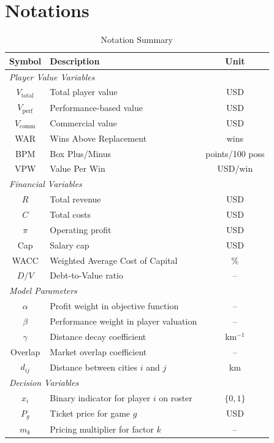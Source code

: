 \documentclass{mcmthesis}
\begin{document}
\section{Notations}    %

\begin{table}[H]
\centering
\caption{Notation Summary}
\begin{tabular}{clc}
\toprule
\textbf{Symbol} & \textbf{Description} & \textbf{Unit} \\
\midrule
\multicolumn{3}{l}{\textit{Player Value Variables}} \\
$V_{\text{total}}$ & Total player value & USD \\
$V_{\text{perf}}$ & Performance-based value & USD \\
$V_{\text{comm}}$ & Commercial value & USD \\
WAR & Wins Above Replacement & wins \\
BPM & Box Plus/Minus & points/100 poss \\
VPW & Value Per Win & USD/win \\
\midrule
\multicolumn{3}{l}{\textit{Financial Variables}} \\
$R$ & Total revenue & USD \\
$C$ & Total costs & USD \\
$\pi$ & Operating profit & USD \\
Cap & Salary cap & USD \\
WACC & Weighted Average Cost of Capital & \% \\
$D/V$ & Debt-to-Value ratio & -- \\
\midrule
\multicolumn{3}{l}{\textit{Model Parameters}} \\
$\alpha$ & Profit weight in objective function & -- \\
$\beta$ & Performance weight in player valuation & -- \\
$\gamma$ & Distance decay coefficient & km$^{-1}$ \\
Overlap & Market overlap coefficient & -- \\
$d_{ij}$ & Distance between cities $i$ and $j$ & km \\
\midrule
\multicolumn{3}{l}{\textit{Decision Variables}} \\
$x_i$ & Binary indicator for player $i$ on roster & $\{0,1\}$ \\
$P_g$ & Ticket price for game $g$ & USD \\
$m_k$ & Pricing multiplier for factor $k$ & -- \\
\bottomrule
\end{tabular}
\end{table}
\end{document}

